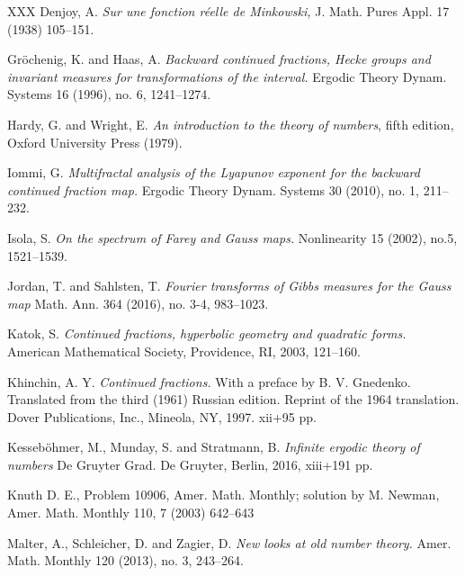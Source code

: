 \documentclass[letterpaper,10pt,reqno]{amsart}
\numberwithin{equation}{section}     %
\begin{document}
\begin{thebibliography}{XXX}
 Denjoy, A. \emph{Sur une fonction r\'eelle de Minkowski,}  J. Math. Pures Appl. 17 (1938) 105--151.



 Gr\"ochenig, K. and Haas, A. \emph{Backward continued fractions, Hecke groups and invariant measures for transformations of the interval. } Ergodic Theory Dynam. Systems  16  (1996),  no. 6, 1241--1274.


 Hardy, G.  and  Wright, E.  \emph{An introduction to the theory of
numbers}, fifth edition, Oxford University Press (1979).


 Iommi, G. \emph{Multifractal analysis of the Lyapunov exponent for the backward continued fraction map.} Ergodic Theory Dynam. Systems 30 (2010), no. 1, 211--232.



 Isola, S. \emph{On the spectrum of Farey and Gauss maps.}
Nonlinearity 15 (2002), no.5, 1521--1539.





 Jordan, T. and Sahlsten, T. \emph{Fourier transforms of Gibbs measures for the Gauss map}
Math. Ann. 364 (2016), no. 3-4, 983--1023.

 Katok, S. \emph{Continued fractions, hyperbolic geometry and quadratic forms.}
American Mathematical Society, Providence, RI, 2003, 121--160.

 Khinchin, A. Y. \emph{Continued fractions.} With a preface by B. V. Gnedenko. Translated from the third (1961) Russian edition. Reprint of the 1964 translation. Dover Publications, Inc., Mineola, NY, 1997. xii+95 pp.

%

 Kesseb\"ohmer, M., Munday, S. and Stratmann, B. \emph{Infinite ergodic theory of numbers} De Gruyter Grad. De Gruyter, Berlin, 2016, xiii+191 pp.

  Knuth  D. E., Problem 10906, Amer. Math. Monthly; solution by M. Newman, Amer. Math. Monthly 110,  7
(2003) 642--643

 Malter, A., Schleicher, D. and Zagier, D. \emph{New looks at old number theory.}
Amer. Math. Monthly 120 (2013), no. 3, 243--264.


\end{thebibliography}
\end{document}
